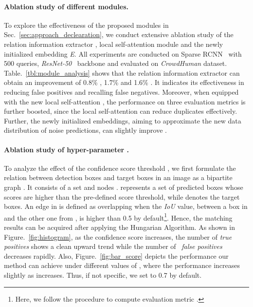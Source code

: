 \documentclass[final]{cvpr}
\begin{document}
\vspace{-0.5cm}
\paragraph{Ablation study of different modules.}
To explore the effectiveness of the proposed modules in Sec.~\ref{sec:approach_declearation}, we conduct extensive ablation study of the relation information extractor , local self-attention module  and the newly initialized embedding \emph{E}. All experiments are conducted on Sparse RCNN~\cite{sun2020sparse} with 500 queries, \emph{ResNet-50}~\cite{he2016deep} backbone and evaluated on \emph{CrowdHuman} dataset. Table.~\ref{tbl:module_analysis} shows that the relation information extractor  can obtain an improvement of 0.8\% , 1.7\%  and 1.6\% . It indicates its effectiveness in reducing false positives and recalling false negatives. Moreover, when equipped with the new local self-attention , the performance on three evaluation metrics is further boosted, since the local self-attention can reduce duplicates effectively. Further, the newly initialized embeddings, aiming to approximate the new data distribution of noise predictions, can slightly improve .

\vspace{-0.5cm}
\paragraph{Ablation study of hyper-parameter .}
To analyze the effect of the confidence score threshold , we first formulate the relation between detection boxes and target boxes in an image as a bipartite graph . It consists of a set  and nodes .  represents a set of predicted boxes whose scores are higher than the pre-defined score threshold, while  denotes the target boxes. An edge in  is defined as overlapping when the \emph{IoU} value, between a box in  and the other one from , is higher than 0.5 by default\footnote{Here, we follow the procedure to compute evaluation metric .}. Hence, the matching results can be acquired after applying the Hungarian Algorithm. As shown in Figure.~\ref{fig:histogram}, as the confidence score increases, the number of \textit{true positives} shows a clean upward trend while the number of ~\textit{false positives} decreases rapidly. Also, Figure.~\ref{fig:bar_score} depicts the performance our method can achieve under different values of , where the performance increases slightly as  increases. Thus, if not specific, we set  to 0.7 by default.
\end{document}
